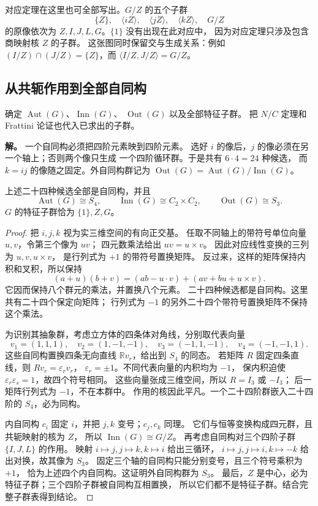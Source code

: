 对应定理在这里也可全部写出。$G/Z$ 的五个子群
\[
\{Z\},\quad\langle iZ\rangle,\quad
\langle jZ\rangle,\quad\langle kZ\rangle,\quad G/Z
\]
的原像依次为 $Z,I,J,L,G$。$\{1\}$ 没有出现在此对应中，
因为对应定理只涉及包含商映射核 $Z$ 的子群。
这张图同时保留交与生成关系：例如
$(I/Z)\cap(J/Z)=\{Z\}$，而 $\langle I/Z,J/Z\rangle=G/Z$。

\subsection{从共轭作用到全部自同构}

\begin{exbox}[换名字能产生多少个不同的自同构]
确定 $\operatorname{Aut}(G)$、$\operatorname{Inn}(G)$、
$\operatorname{Out}(G)$ 以及全部特征子群。
把 $N/C$ 定理和 Frattini 论证也代入已求出的子群。
\end{exbox}

\textbf{解。} 一个自同构必须把四阶元素映到四阶元素。
选好 $i$ 的像后，$j$ 的像必须在另一个轴上；否则两个像只生成
一个四阶循环群。于是共有 $6\cdot4=24$ 种候选，
而 $k=ij$ 的像随之固定。外自同构群记为
$\operatorname{Out}(G)=\operatorname{Aut}(G)/\operatorname{Inn}(G)$。

\begin{proposition}[$Q_8$ 的自同构群]
\label{prop:q8-automorphisms}
上述二十四种候选全部是自同构，并且
\[
\operatorname{Aut}(G)\cong S_4,
\qquad \operatorname{Inn}(G)\cong C_2\times C_2,
\qquad \operatorname{Out}(G)\cong S_3.
\]
$G$ 的特征子群恰为 $\{1\},Z,G$。
\end{proposition}

\begin{proof}
把 $i,j,k$ 视为实三维空间的有向正交基。
任取不同轴上的带符号单位向量 $u,v$，令第三个像为 $uv$；
四元数乘法给出 $uv=u\times v$。
因此对应线性变换的三列为 $u,v,u\times v$，
是行列式为 $+1$ 的带符号置换矩阵。
反过来，这样的矩阵保持内积和叉积，所以保持
\[
(a+u)(b+v)=(ab-u\cdot v)+(av+bu+u\times v).
\]
它因而保持八个群元的乘法，并置换八个元素。
二十四种候选都是自同构。这里共有二十四个保定向矩阵；
行列式为 $-1$ 的另外二十四个带符号置换矩阵不保持这个乘法。

为识别其抽象群，考虑立方体的四条体对角线，分别取代表向量
\[
v_1=(1,1,1),\quad v_2=(1,-1,-1),\quad
v_3=(-1,1,-1),\quad v_4=(-1,-1,1).
\]
这些自同构置换四条无向直线 $\mathbb Rv_r$，给出到 $S_4$ 的同态。
若矩阵 $R$ 固定四条直线，则 $Rv_r=\varepsilon_rv_r$，
$\varepsilon_r=\pm1$。不同代表向量的内积均为 $-1$，
保内积迫使 $\varepsilon_r\varepsilon_s=1$，故四个符号相同。
这些向量张成三维空间，所以 $R=I_3$ 或 $-I_3$；
后一矩阵行列式为 $-1$，不在本群中。
作用的核因此平凡。一个二十四阶群嵌入二十四阶的 $S_4$，必为同构。

内自同构 $c_i$ 固定 $i$，并把 $j,k$ 变号；$c_j,c_k$ 同理。
它们与恒等变换构成四元群，且共轭映射的核为 $Z$，
所以 $\operatorname{Inn}(G)\cong G/Z$。
再考虑自同构对三个四阶子群 $\{I,J,L\}$ 的作用。
映射 $i\mapsto j,j\mapsto k,k\mapsto i$ 给出三循环，
$i\mapsto j,j\mapsto i,k\mapsto-k$ 给出对换，故其像为 $S_3$。
固定三个轴的自同构只能分别变号，且三个符号乘积为 $+1$，
恰为上述四个内自同构。这证明外自同构群为 $S_3$。
最后，$Z$ 是中心，必为特征子群；三个四阶子群被自同构互相置换，
所以它们都不是特征子群。结合完整子群表得到结论。
\end{proof}

